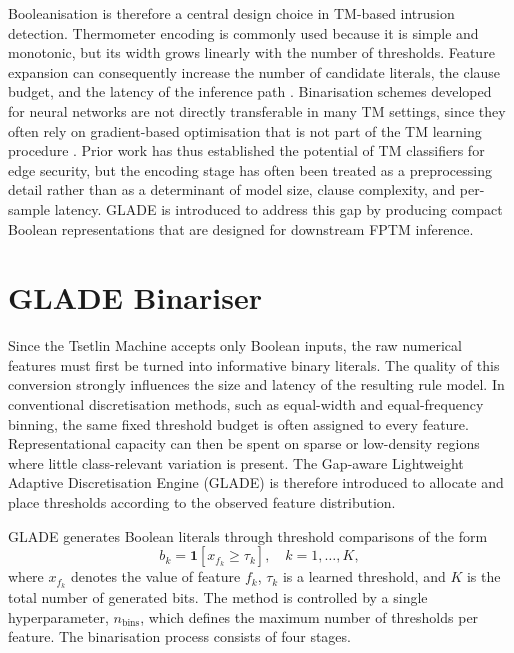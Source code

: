 \documentclass[journal,twoside,web]{ieeecolor}
\begin{document}
Booleanisation is therefore a central design choice in TM-based intrusion detection. Thermometer encoding is commonly used because it is simple and monotonic, but its width grows linearly with the number of thresholds. Feature expansion can consequently increase the number of candidate literals, the clause budget, and the latency of the inference path \cite{granmo2018tsetlin, gunvaldsen2023iot}. Binarisation schemes developed for neural networks are not directly transferable in many TM settings, since they often rely on gradient-based optimisation that is not part of the TM learning procedure \cite{nguyen2025binarized}. Prior work has thus established the potential of TM classifiers for edge security, but the encoding stage has often been treated as a preprocessing detail rather than as a determinant of model size, clause complexity, and per-sample latency. GLADE is introduced to address this gap by producing compact Boolean representations that are designed for downstream FPTM inference.


\section{GLADE Binariser}
\label{sec:glade}

Since the Tsetlin Machine accepts only Boolean inputs, the raw
numerical features must first be turned into informative binary
literals. The quality of this conversion strongly influences the
size and latency of the resulting rule model. In conventional
discretisation methods, such as equal-width and equal-frequency
binning, the same fixed threshold budget is often assigned to every
feature. Representational capacity can then be spent on sparse or
low-density regions where little class-relevant variation is present.
The Gap-aware Lightweight Adaptive Discretisation Engine (GLADE) is
therefore introduced to allocate and place thresholds according to the
observed feature distribution.

GLADE generates Boolean literals through threshold comparisons of
the form
\begin{equation}
  b_k = \mathbf{1}\!\left[ x_{f_k} \geq \tau_k \right],
  \quad k = 1, \ldots, K,
\end{equation}
where $x_{f_k}$ denotes the value of feature $f_k$, $\tau_k$ is a
learned threshold, and $K$ is the total number of generated bits.
The method is controlled by a single hyperparameter,
$n_\text{bins}$, which defines the maximum number of thresholds per
feature. The binarisation process consists of four stages.
\end{document}
